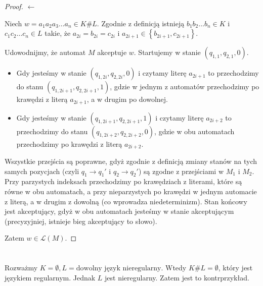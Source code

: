 \documentclass{article}
\theoremstyle{definition}
\theoremstyle{remark}
\begin{document}
\begin{proof}
    \(\leftarrow\)

    Niech \(w = a_1 a_2 a_3\ldots a_n \in K \# L\). Zgodnie z definicją istnieją \(b_1 b_2 \ldots b_n \in K\) i \(c_1 c_2 \ldots c_n \in L\) takie, że \(a_{2i} = b_{2i} = c_{2i}\) i \(a_{2i+1} \in \left\{ b_{2i+1}, c_{2i+1} \right\}\).
    
    
    Udowodnijmy, że automat \(M\) akceptuje \(w\). Startujemy w stanie \(\left(q_{1,1}, q_{2,1}, 0 \right)\).
    \begin{itemize}
        \item Gdy jesteśmy w stanie \(\left(q_{1,2i}, q_{2,2i}, 0 \right)\) i czytamy literę \(a_{2i+1}\)
        to przechodzimy do stanu \(\left(q_{1,2i+1}, q_{2,2i+1}, 1 \right)\),
        gdzie w jednym z automatów przechodzimy po krawędzi z literą \(a_{2i+1}\), a w drugim po dowolnej.
        \item Gdy jesteśmy w stanie \(\left(q_{1,2i+1}, q_{2,2i+1}, 1 \right)\) i czytamy literę \(a_{2i+2}\)
        to przechodzimy do stanu \(\left(q_{1,2i+2}, q_{2,2i+2}, 0 \right)\), gdzie w obu automatach przechodzimy po krawędzi z literą \(a_{2i+2}\).
    \end{itemize}

    Wszystkie przejścia są poprawne, gdyż zgodnie z definicją zmiany stanów na tych samych pozycjach (czyli \(q_1 \rightarrow q_1'\) i \(q_2 \rightarrow q_2'\))
    są zgodne z przejściami w \(M_1\) i \(M_2\).
    Przy parzystych indeksach przechodzimy po krawędziach z literami, które są równe w obu automatach,
    a przy nieparzystych po krawędzi w jednym automacie z literą, a w drugim z dowolną (co wprowadza niedeterminizm).
    Stan końcowy jest akceptujący, gdyż w obu automatach jesteśmy w stanie akceptującym (precyzyjniej, istnieje bieg akceptujący to słowo).

    Zatem \(w \in \mathcal{L}(M)\).
\end{proof}

\section{}

Rozważmy \(K = \emptyset, L = \text{dowolny język nieregularny}\). Wtedy
\(K \# L = \emptyset\), który jest językiem regularnym. Jednak \(L\)
jest nieregularny. Zatem jest to kontrprzykład.

\section{}
\end{document}
